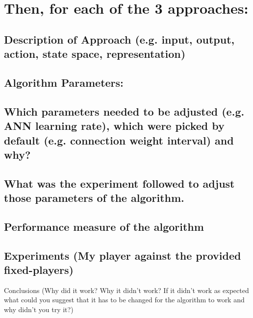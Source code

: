 \section{Then, for each of the 3 approaches:}
\label{sec:mcts}

\subsection{Description of Approach (e.g. input, output, action, state space,
representation)}

\subsection{Algorithm Parameters:}

\subsection{Which parameters needed to be adjusted (e.g. ANN learning rate),
which were picked by default (e.g. connection weight interval) and why?}

\subsection{What was the experiment followed to adjust those parameters of the
algorithm.}

\subsection{Performance measure of the algorithm}

\subsection{Experiments (My player against the provided ﬁxed-players)}
Conclusions (Why did it work? Why it didn't work? If it didn't work as expected what could you suggest that it has to be changed for the algorithm to work and why didn't you try it?)
